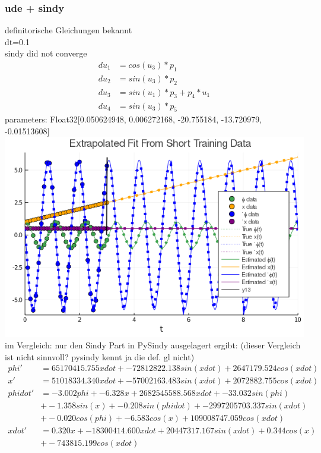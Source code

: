 \documentclass[arbeit=studie,oneside,BCOR=12mm]{ArbeitRST}
\begin{document}
\subsubsection{ude + sindy}
definitorische Gleichungen bekannt\\
dt=0.1\\
sindy did not converge
\begin{align}
du_1 &= cos(u_3) * p_1\\
du_2 &= sin(u_3) * p_2\\
du_3 &= sin(u_1) * p_3 + p_4 * u_1\\
du_4 &= sin(u_3) * p_5
\end{align}
parameters: Float32[0.050624948, 0.006272168, -20.755184, -13.720979, -0.01513608]
\includegraphics[width=1\textwidth]{images/ude_ident_with_prior_knowledge}
im Vergleich: nur den Sindy Part in PySindy ausgelagert ergibt: (dieser Vergleich ist nicht sinnvoll? pysindy kennt ja die def. gl nicht)
\begin{align*}
phi' &= 65170415.755 xdot + -72812822.138 sin(xdot) + 2647179.524 cos(xdot)\\
x' &= 51018334.340 xdot + -57002163.483 sin(xdot) + 2072882.755 cos(xdot)\\
phidot' &= -3.002 phi + -6.328 x + 2682545588.568 xdot + -33.032 sin(phi) \\&+ -1.358 sin(x) + -0.208 sin(phidot) + -2997205703.337 sin(xdot) \\&+ -0.020 cos(phi) + -6.583 cos(x) + 109008747.059 cos(xdot)\\
xdot' &= 0.320 x + -18300414.600 xdot + 20447317.167 sin(xdot) + 0.344 cos(x) \\&+ -743815.199 cos(xdot)
\end{align*}
\end{document}
